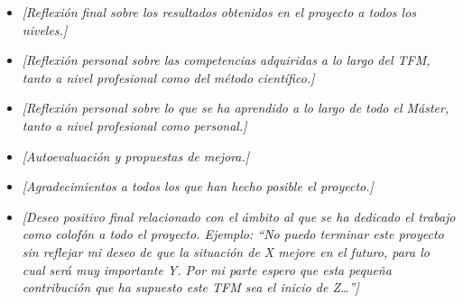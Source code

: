 \begin{itemize}
    \item \textit{[Reflexión final sobre los resultados obtenidos en el proyecto a todos los niveles.]}
    \item \textit{[Reflexión personal sobre las competencias adquiridas a lo largo del TFM, tanto a nivel profesional como del método científico.]}
    \item \textit{[Reflexión personal sobre lo que se ha aprendido a lo largo de todo el Máster, tanto a nivel profesional como personal.]}
    \item \textit{[Autoevaluación y propuestas de mejora.]}
    \item \textit{[Agradecimientos a todos los que han hecho posible el proyecto.]}
    \item \textit{[Deseo positivo final relacionado con el ámbito al que se ha dedicado el trabajo como colofón a todo el proyecto. Ejemplo: ``No puedo terminar este proyecto sin reflejar mi deseo de que la situación de X mejore en el futuro, para lo cual será muy importante Y. Por mi parte espero que esta pequeña contribución que ha supuesto este TFM sea el inicio de Z\ldots'']}
\end{itemize}
